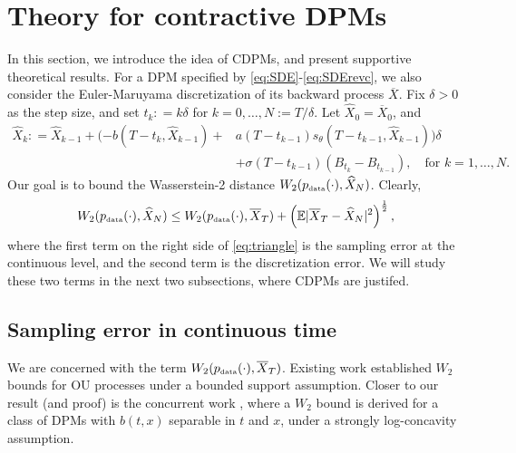 \documentclass[letterpaper,11pt,reqno]{amsart}
\numberwithin{equation}{section}
\begin{document}
\section{Theory for contractive DPMs}
\label{sc3}

\quad In this section,
we introduce the idea of CDPMs, and present supportive theoretical results.
For a DPM specified by \eqref{eq:SDE}-\eqref{eq:SDErevc},
we also consider the Euler-Maruyama discretization of its backward process $\overline{X}$.
Fix $\delta > 0$ as the step size,
and set $t_k: = k \delta$ for $k = 0, \ldots, N:= T/\delta$.
Let $\widehat{X}_0 = \overline{X}_0$, 
and 
\begin{equation}
\label{eq:EMdisc}
\begin{aligned}
\widehat{X}_k: = \widehat{X}_{k-1} + (-b(T - t_k, \widehat{X}_{k-1}) + 
& a(T - t_{k-1}) s_\theta(T - t_{k-1}, \widehat{X}_{k-1})) \delta \\
& + \sigma(T-t_{k-1}) (B_{t_k} - B_{t_{k-1}}), 
\quad \mbox{for } k = 1,\ldots, N.
\end{aligned}
\end{equation}
Our goal is to bound the Wasserstein-2 distance $W_2(p_{\tiny \mbox{data}}(\cdot), \widehat{X}_N)$.
Clearly, 
\begin{equation}
\label{eq:triangle}
W_2(p_{\tiny \mbox{data}}(\cdot), \widehat{X}_N)
\le W_2(p_{\tiny \mbox{data}}(\cdot), \overline{X}_T)
+ \left(\mathbb{E}|\overline{X}_T - \widehat{X}_N|^2\right)^{\frac{1}{2}},
\end{equation}
where the first term on the right side of \eqref{eq:triangle} is
the sampling error at the continuous level,
and the second term is the discretization error.
We will study these two terms in the next two subsections,
where CDPMs are justifed.

\subsection{Sampling error in continuous time}
\label{sc31}

We are concerned with the term $W_2(p_{\tiny \mbox{data}}(\cdot), \overline{X}_T)$.
Existing work \cite{Chen23, LLT23, DV21} established $W_2$ bounds 
for OU processes under a bounded support assumption.
Closer to our result (and proof) is the concurrent work \cite{GNZ23}, 
where a $W_2$ bound is derived
for a class of DPMs with $b(t,x)$ separable in $t$ and $x$,
under a strongly log-concavity assumption.
\end{document}
